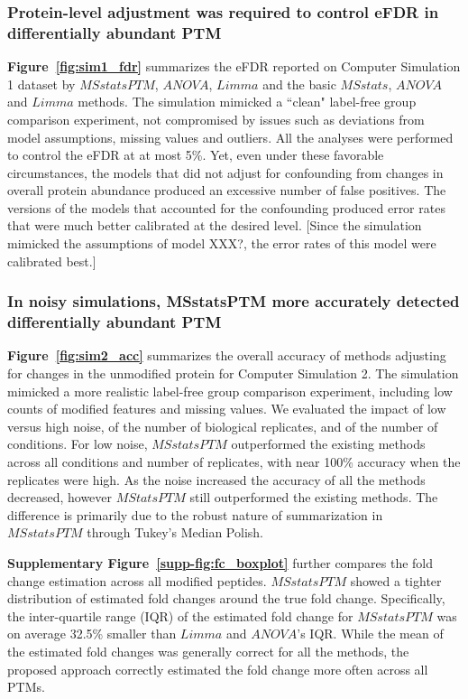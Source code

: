 \documentclass[mcp]{article}
\numberwithin{table}{section}
\def\todo#1{{\color{red}[#1]}}
\def\figref#1{{\bf Figure~\ref{fig:#1}}}
\begin{document}
\subsubsection*{Protein-level adjustment was required to control eFDR in differentially abundant PTM}

\figref{sim1_fdr} summarizes the eFDR reported on Computer Simulation 1 dataset by $MSstatsPTM$, $ANOVA$, $Limma$ and the basic $MSstats$, $ANOVA$ and $Limma$ methods. The  simulation mimicked a ``clean" label-free group comparison experiment, not compromised by issues such as deviations from model assumptions, missing values and outliers. All the analyses were performed to control the eFDR at at most 5\%.  Yet, even under these favorable circumstances, the models that did not adjust for confounding from changes in overall protein abundance produced an excessive number of false positives. The versions of the models that accounted for the confounding produced error rates that were much better calibrated at the desired level. \todo{Since the simulation mimicked the assumptions of model XXX?, the error rates of this model were calibrated best.}



\subsubsection*{In noisy simulations, MSstatsPTM more accurately detected differentially abundant PTM}

\figref{sim2_acc} summarizes the overall accuracy of methods adjusting for changes in the unmodified protein for Computer Simulation 2. The simulation mimicked a more realistic label-free group comparison experiment, including low counts of modified features and missing values. We evaluated the impact of low versus high noise, of the number of biological replicates, and of the number of conditions. For low noise, $MSstatsPTM$ outperformed the existing methods across all conditions and number of replicates, with near 100\% accuracy when the replicates were high. As the noise increased the accuracy of all the methods decreased, however $MStatsPTM$ still outperformed the existing methods. The difference is primarily due to the robust nature of summarization in $MSstatsPTM$ through Tukey's Median Polish. 

{\bf Supplementary Figure~\ref{supp-fig:fc_boxplot}} further compares the fold change estimation across all modified peptides. $MSstatsPTM$ showed a tighter distribution of estimated fold changes around the true fold change. Specifically, the inter-quartile range (IQR) of the estimated fold change for $MSstatsPTM$ was on average 32.5\% smaller than $Limma$ and $ANOVA$'s IQR. While the mean of the estimated fold changes was generally correct for all the methods, the proposed approach correctly estimated the fold change more often across all PTMs.
\end{document}
